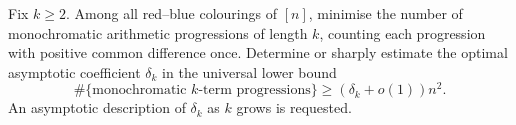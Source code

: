 Fix $k\geq2$. Among all red--blue colourings of $[n]$, minimise the number of monochromatic arithmetic progressions of length $k$, counting each progression with positive common difference once. Determine or sharply estimate the optimal asymptotic coefficient $\delta_k$ in the universal lower bound
\[\#\{\text{monochromatic }k\text{-term progressions}\}\geq (\delta_k+o(1))n^2.\]
An asymptotic description of $\delta_k$ as $k$ grows is requested.
